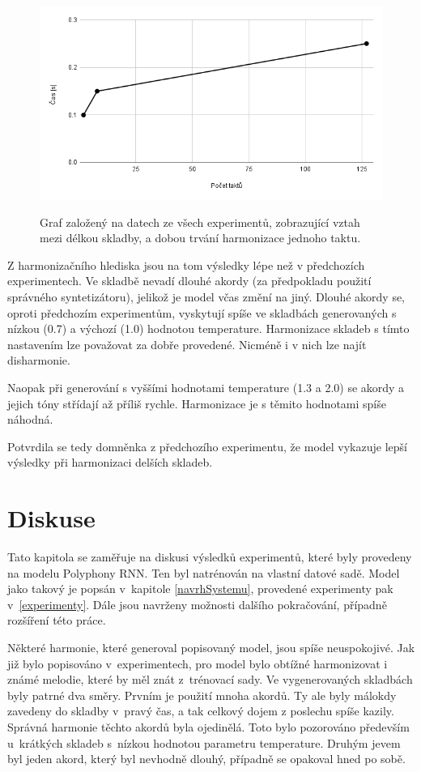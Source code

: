 \begin{figure}[h]\centering
    \centering
    \includegraphics[width=0.8\linewidth]{obrazky/chartCasHarmonizace.png}\\[1pt]  
    \caption{Graf založený na datech ze všech experimentů,
     zobrazující vztah mezi délkou skladby, a dobou trvání harmonizace jednoho taktu.}    
    \label{obrazekCasHarmonizace}
\end{figure}

Z harmonizačního hlediska jsou na tom výsledky lépe než v předchozích experimentech.
Ve skladbě nevadí dlouhé akordy (za předpokladu použití správného syntetizátoru),
jelikož je model včas změní na jiný.
Dlouhé akordy se, oproti předchozím experimentům,
vyskytují spíše ve skladbách generovaných s nízkou (0.7) a výchozí (1.0) hodnotou temperature.
Harmonizace skladeb s tímto nastavením lze považovat za dobře provedené.
Nicméně i v nich lze najít disharmonie.
\par
Naopak při generování s vyššími hodnotami temperature (1.3 a 2.0) 
se akordy a jejich tóny střídají až příliš rychle.
Harmonizace je s těmito hodnotami spíše náhodná.
\par
Potvrdila se tedy domněnka z předchozího experimentu,
že model vykazuje lepší výsledky při harmonizaci
delších skladeb.


\chapter{Diskuse}
Tato kapitola se zaměřuje na diskusi výsledků experimentů,
které byly provedeny na modelu Polyphony RNN.
Ten byl natrénován na vlastní datové sadě.
Model jako takový je popsán v~kapitole \ref{navrhSystemu},
provedené experimenty pak v~\ref{experimenty}.
Dále jsou navrženy možnosti dalšího pokračování,
případně rozšíření této práce.
\par

Některé harmonie, které generoval popisovaný model,
jsou spíše neuspokojivé.
Jak již bylo popisováno v~experimentech, 
pro model bylo obtížné harmonizovat i známé melodie, 
které by měl znát z~trénovací sady. 
Ve vygenerovaných skladbách byly patrné dva směry.
Prvním je použití mnoha akordů.
Ty ale byly málokdy zavedeny do skladby v~pravý čas, 
a tak celkový dojem z poslechu spíše kazily.
Správná harmonie těchto akordů byla ojedinělá.
Toto bylo pozorováno především u~krátkých skladeb 
s~nízkou hodnotou parametru temperature.
Druhým jevem byl jeden akord, 
který byl nevhodně dlouhý,
případně se opakoval hned po sobě.
\par

